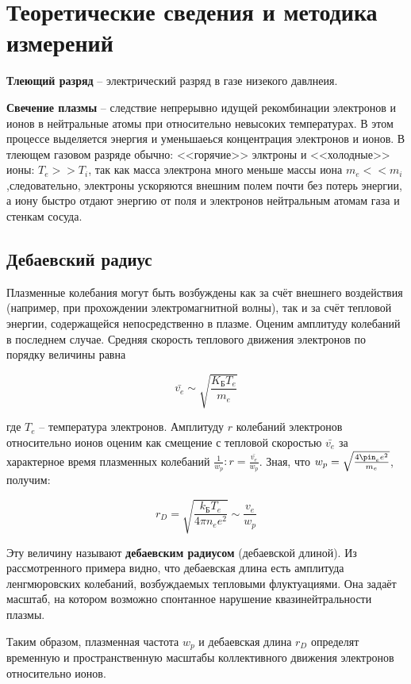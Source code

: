 \documentclass [a4paper, 12pt]{article}
\begin{document}
\section{Теоретические сведения и методика измерений}

    \textbf{Тлеющий разряд} -- электрический разряд в газе низекого давлнеия.
 
    \textbf{Свечение плазмы} -- следствие непрерывно идущей рекомбинации электронов и ионов в нейтральные атомы при относительно невысоких температурах. В этом процессе выделяется энергия и уменьшаеься концентрация электронов и ионов. В тлеющем газовом разряде обычно: <<горячие>> элктроны и <<холодные>> ионы: $T_e > > T_i$, так как масса электрона много меньше массы иона $m_e < < m_i$,следовательно, электроны ускоряются внешним полем почти без потерь энергии, а иону быстро отдают энергию от поля и электронов нейтральным атомам газа и стенкам сосуда.

\subsection*{Дебаевский радиус}

    Плазменные колебания могут быть возбуждены как за счёт внешнего воздействия (например, при прохождении электромагнитной волны), так и за счёт тепловой энергии, содержащейся непосредственно в плазме. Оценим амплитуду колебаний в последнем случае. Средняя скорость теплового движения электронов по порядку величины равна

\[ \bar{v_e} \sim \sqrt{\frac{K_{Б}T_e}{m_e}}\]

    где $T_e$ -- температура электронов. Амплитуду $r$ колебаний электронов относительно ионов оценим как смещение с тепловой скоростью $\bar{v_e}$ за характерное время плазменных колебаний $\frac{1}{w_p}: r = \frac{\bar{v_e}}{w_p}$. Зная, что $w_p = \sqrt{\frac{4\pin_e e^2}{m_e}}$, получим:
    
\[r_D = \sqrt{\frac{k_{Б}T_e}{4\pi n_e e^2}} \sim \frac{v_e}{w_p}\]

    Эту величину называют \textbf{дебаевским радиусом} (дебаевской длиной). Из рассмотренного примера видно, что дебаевская длина есть амплитуда ленгмюровских колебаний, возбуждаемых тепловыми флуктуациями. Она задаёт масштаб, на котором возможно спонтанное нарушение квазинейтральности плазмы.

    Таким образом, плазменная частота $w_p$ и дебаевская длина $r_D$ определят временную и пространственную масштабы коллективного движения электронов относительно ионов.
\end{document}

